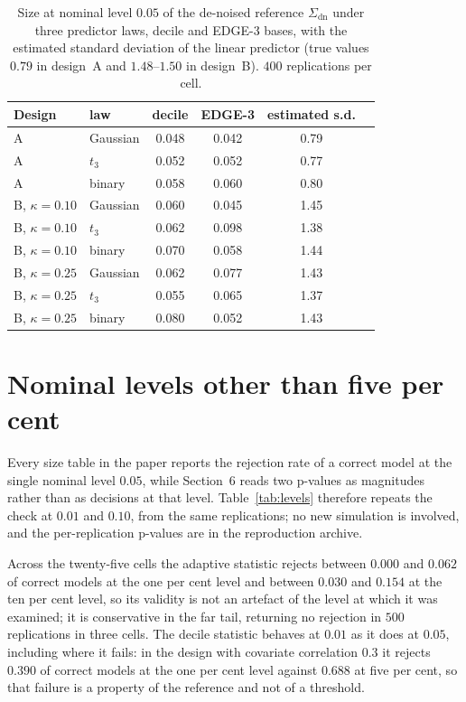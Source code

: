 \documentclass[namedate,webpdf,modern,mediumone]{oup-authoring-template}
\begin{document}
\begin{table}[!t]
\centering
\caption{Size at nominal level $0.05$ of the de-noised reference $\Sigma_{\mathrm{dn}}$ under three predictor
laws, decile and EDGE-3 bases, with the estimated standard deviation of the linear predictor
(true values $0.79$ in design~A and $1.48$--$1.50$ in design~B). $400$ replications per cell.}
\label{tab:suplaw}
\begin{tabular}{llcccc}
\toprule
Design & law & decile & EDGE-3 & estimated s.d. \\
\midrule
A                  & Gaussian & 0.048 & 0.042 & 0.79 \\
A                  & $t_3$    & 0.052 & 0.052 & 0.77 \\
A                  & binary   & 0.058 & 0.060 & 0.80 \\
\addlinespace
B, $\kappa = 0.10$ & Gaussian & 0.060 & 0.045 & 1.45 \\
B, $\kappa = 0.10$ & $t_3$    & 0.062 & 0.098 & 1.38 \\
B, $\kappa = 0.10$ & binary   & 0.070 & 0.058 & 1.44 \\
\addlinespace
B, $\kappa = 0.25$ & Gaussian & 0.062 & 0.077 & 1.43 \\
B, $\kappa = 0.25$ & $t_3$    & 0.055 & 0.065 & 1.37 \\
B, $\kappa = 0.25$ & binary   & 0.080 & 0.052 & 1.43 \\
\bottomrule
\end{tabular}
\end{table}



\section{Nominal levels other than five per cent}\label{sup:levels}

Every size table in the paper reports the rejection rate of a correct model at the single nominal
level $0.05$, while Section~6 reads two p-values as magnitudes rather than as decisions at that
level. Table~\ref{tab:levels} therefore repeats the check at $0.01$ and $0.10$, from the same
replications; no new simulation is involved, and the per-replication p-values are in the
reproduction archive.

Across the twenty-five cells the adaptive statistic rejects between $0.000$ and $0.062$ of correct
models at the one per cent level and between $0.030$ and $0.154$ at the ten per cent level, so its
validity is not an artefact of the level at which it was examined; it is conservative in the far
tail, returning no rejection in $500$ replications in three cells. The decile statistic behaves at
$0.01$ as it does at $0.05$, including where it fails: in the design with covariate correlation
$0.3$ it rejects $0.390$ of correct models at the one per cent level against $0.688$ at five per
cent, so that failure is a property of the reference and not of a threshold.
\end{document}
